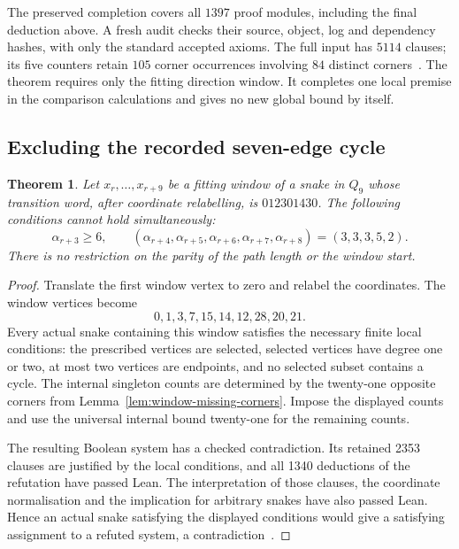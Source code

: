 \documentclass[11pt,a4paper]{article}
\newtheorem{theorem}{Theorem}[section]
\theoremstyle{definition}
\theoremstyle{remark}
\newcommand{\Q}{Q}
\begin{document}
The preserved completion covers all $1397$ proof modules, including the
final deduction above. A fresh audit checks their source, object, log and
dependency hashes, with only the standard accepted axioms. The full input
has $5114$ clauses; its five counters retain $105$ corner occurrences
involving $84$ distinct corners~\cite{criticalcountarchive,totalcountarchive,share145archive}.
The theorem requires only the fitting direction window. It completes one
local premise in the comparison calculations and gives no new global bound
by itself.

\subsection{Excluding the recorded seven-edge cycle}\label{sec:seven-cycle-exclusion}
\begin{theorem}\label{thm:nine-window-exclusion}
Let $x_r,\ldots,x_{r+9}$ be a fitting window of a snake in $\Q_9$ whose
transition word, after coordinate relabelling, is $012301430$.
The following conditions cannot hold simultaneously:
\[
\alpha_{r+3}\ge6,\qquad
(\alpha_{r+4},\alpha_{r+5},\alpha_{r+6},\alpha_{r+7},\alpha_{r+8})
=(3,3,3,5,2).
\]
There is no restriction on the parity of the path length or the window start.
\end{theorem}
\begin{proof}
Translate the first window vertex to zero and relabel the coordinates.
The window vertices become
\[
0,1,3,7,15,14,12,28,20,21.
\]
Every actual snake containing this window satisfies the necessary finite
local conditions: the prescribed vertices are selected, selected vertices
have degree one or two, at most two vertices are endpoints, and no selected
subset contains a cycle. The internal singleton counts are determined by
the twenty-one opposite corners from Lemma~\ref{lem:window-missing-corners}.
Impose the displayed counts and use the universal internal bound
twenty-one for the remaining counts.

The resulting Boolean system has a checked contradiction. Its retained
2353 clauses are justified by the local conditions, and all 1340 deductions
of the refutation have passed Lean. The interpretation of those clauses,
the coordinate normalisation and the implication for arbitrary snakes have
also passed Lean. Hence an actual snake satisfying the displayed conditions
would give a satisfying assignment to a refuted system, a contradiction~\cite{sevencyclearchive}.
\end{proof}
\end{document}
